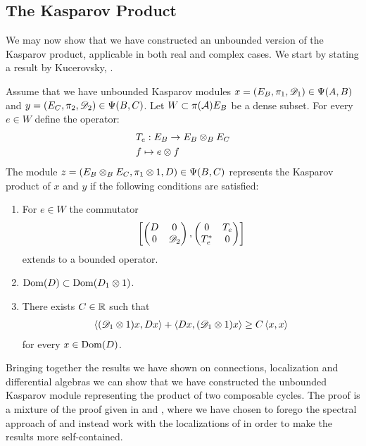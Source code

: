 \subsection{The Kasparov Product}
We may now show that we have constructed an unbounded version of the Kasparov product, applicable in both real and complex cases. 
We start by stating a result by Kucerovsky, \cite[Theorem 13]{kucerovsky}. 
\begin{theorem}\label{kucerovskycrit}
	Assume that we have unbounded Kasparov modules $x=(E_B,\pi_1,\mathscr{D}_1)\in \Psi(A,B)$  and $y=(E_C,\pi_2,\mathscr{D}_2)\in \Psi(B,C)$. 			Let $W\subset \pi(\mathcal{A})E_B$ be a dense subset. For every $e\in W$ define the operator:
	\begin{align*}
		&T_e:E_B\to E_B\otimes_B E_C \\
		&f\mapsto e\otimes f
	\end{align*}
	The module $z=(E_B\otimes_B E_C,\pi_1\otimes 1,D)\in \Psi(B,C)$ represents the Kasparov product of $x$ and $y$ if the following conditions are satisfied:
	\begin{enumerate}
		\item
			For $e\in W$ the commutator
			\begin{align*}
			\begin{bmatrix}
				\begin{pmatrix} D & 0 \\ 0 & \mathscr{D}_2 \end{pmatrix}, \begin{pmatrix} 0 & T_e \\ T_e^* & 0\end{pmatrix}	
			\end{bmatrix}
			\end{align*}
			 extends to a bounded operator. 
		\item
			$\operatorname{Dom}(D)\subset \operatorname{Dom}(D_1\otimes 1)$. 
		\item
			There exists $C\in \mathbb{R}$ such that
			\begin{align*}
				\left \langle (\mathscr{D}_1\otimes 1) x,D x \right \rangle+\left \langle D x,(\mathscr{D}_1\otimes 1)x \right \rangle\geq C\left \langle x,x \right \rangle
			\end{align*}
			for every $x\in \operatorname{Dom}(D)$.
\end{enumerate}
\end{theorem}
Bringing together the results we have shown on connections, localization and differential algebras we can show that we have constructed the unbounded Kasparov module representing the product of two composable cycles. The proof is a mixture of the proof given in \cite{unboundkasp} and \cite{mesrennie}, where we have chosen to forego the spectral approach of \cite{mesrennie} and instead work with the localizations of \cite{unboundkasp} in order to make the results more self-contained. 
